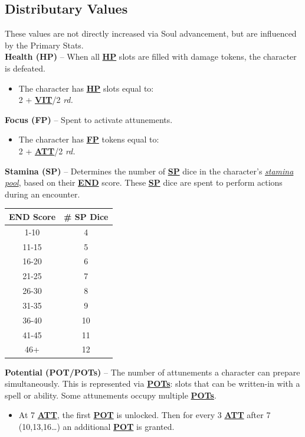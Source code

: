 \documentclass[12pt]{article}
\newcommand{\refto}[1]{\hyperlink{#1}{\textbf{#1}}}
\newcommand{\makeref}[1]{\hypertarget{#1}{\textbf{#1}}}
\newcommand{\reftoit}[1]{\hyperlink{#1}{\emph{#1}}}
\begin{document}
\begin{multicols*}{2}
\subsection{Distributary Values}
These values are not directly increased via Soul advancement, but are influenced by the Primary Stats.\\

\textbf{Health (\makeref{HP})} – When all \refto{HP} slots are filled with damage tokens, the character is defeated.
\begin{itemize}
\item The character has \refto{HP} slots equal to:\\
2 + \refto{VIT}/2 \emph{rd.}
\end{itemize}

\textbf{Focus (\makeref{FP})} – Spent to activate attunements.
\begin{itemize}
\item The character has \refto{FP} tokens equal to:\\
2 + \refto{ATT}/2 \emph{rd.}
\end{itemize}

\setlength{\tabcolsep}{11pt}
\renewcommand{\arraystretch}{1.2}

\textbf{Stamina (\makeref{SP})} – Determines the number of \refto{SP} dice in the character’s \reftoit{stamina pool}, based on their \refto{END} score. These \refto{SP} dice are spent to perform actions during an encounter.
\begin{center}
\begin{tabular}{ |c|c| }
\hline
\textbf{END Score} & \textbf{\# SP Dice}\\
\hline
1-10 & 4\\
\hline
11-15 & 5\\
\hline
16-20 & 6\\
\hline
21-25 & 7\\
\hline
26-30 & 8\\
\hline
31-35 & 9\\
\hline
36-40 & 10\\
\hline
41-45 & 11\\
\hline
46+ & 12\\
\hline
\end{tabular}
\end{center}

\textbf{Potential (\makeref{POT}/\makeref{POTs})} – The number of attunements a character can prepare simultaneously. This is represented via \refto{POTs}: slots that can be written-in with a spell or ability. Some attunements occupy multiple \refto{POTs}.
\begin{itemize}
\item At 7 \refto{ATT}, the first \refto{POT} is unlocked. Then for every 3 \refto{ATT} after 7 (10,13,16…) an additional \refto{POT} is granted.
\end{itemize}


\end{multicols*}
\end{document}
